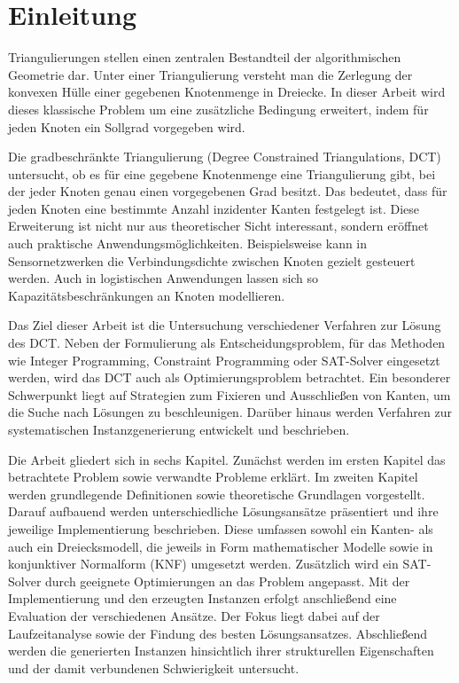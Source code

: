\chapter{Einleitung}
\label{ch:introduction}%
Triangulierungen stellen einen zentralen Bestandteil der algorithmischen Geometrie dar. 
Unter einer Triangulierung versteht man die Zerlegung der konvexen Hülle einer gegebenen Knotenmenge in Dreiecke. 
In dieser Arbeit wird dieses klassische Problem um eine zusätzliche Bedingung erweitert, indem für jeden Knoten ein Sollgrad vorgegeben wird.

Die gradbeschränkte Triangulierung (Degree Constrained Triangulations, DCT) untersucht, ob es für eine gegebene Knotenmenge eine Triangulierung gibt, 
bei der jeder Knoten genau einen vorgegebenen Grad besitzt. 
Das bedeutet, dass für jeden Knoten eine bestimmte Anzahl inzidenter Kanten festgelegt ist. 
Diese Erweiterung ist nicht nur aus theoretischer Sicht interessant, sondern eröffnet auch praktische Anwendungsmöglichkeiten. 
Beispielsweise kann in Sensornetzwerken die Verbindungsdichte zwischen Knoten gezielt gesteuert werden. 
Auch in logistischen Anwendungen lassen sich so Kapazitätsbeschränkungen an Knoten modellieren.

Das Ziel dieser Arbeit ist die Untersuchung verschiedener Verfahren zur Lösung des DCT. 
Neben der Formulierung als Entscheidungsproblem, für das Methoden wie Integer Programming, Constraint Programming oder SAT-Solver eingesetzt werden, 
wird das DCT auch als Optimierungsproblem betrachtet. 
Ein besonderer Schwerpunkt liegt auf Strategien zum Fixieren und Ausschließen von Kanten, um die Suche nach Lösungen zu beschleunigen. 
Darüber hinaus werden Verfahren zur systematischen Instanzgenerierung entwickelt und beschrieben.

Die Arbeit gliedert sich in sechs Kapitel. 
Zunächst werden im ersten Kapitel das betrachtete Problem sowie verwandte Probleme erklärt.
Im zweiten Kapitel werden grundlegende Definitionen sowie theoretische Grundlagen vorgestellt. 
Darauf aufbauend werden unterschiedliche Lösungsansätze präsentiert und ihre jeweilige Implementierung beschrieben. 
Diese umfassen sowohl ein Kanten- als auch ein Dreiecksmodell, die jeweils in Form mathematischer Modelle sowie in konjunktiver Normalform (KNF) umgesetzt werden. 
Zusätzlich wird ein SAT-Solver durch geeignete Optimierungen an das Problem angepasst. 
Mit der Implementierung und den erzeugten Instanzen erfolgt anschließend eine Evaluation der verschiedenen Ansätze. 
Der Fokus liegt dabei auf der Laufzeitanalyse sowie der Findung des besten Lösungsansatzes. 
Abschließend werden die generierten Instanzen hinsichtlich ihrer strukturellen Eigenschaften und der damit verbundenen Schwierigkeit untersucht.


